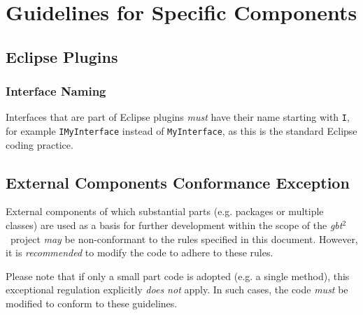 \documentclass[a4paper,12pt,liststotoc,DIV12]{scrartcl}
\newcommand{\gbt}{\textit{gbt$^2$}}
\begin{document}
\section{Guidelines for Specific Components}
\label{sec:specific-components}

\subsection{Eclipse Plugins}
\label{sec:specific:eclipse-plugins}

\subsubsection{Interface Naming}
\label{sec:eclipse:interface-naming}

Interfaces that are part of Eclipse plugins \emph{must} have their name
starting with \texttt{I}, for example \texttt{IMyInterface} instead of
\texttt{MyInterface}, as this is the standard Eclipse coding practice.

\subsection{External Components Conformance Exception}
\label{sec:specific:external-components}

External components of which substantial parts (e.g. packages or multiple
classes) are used as a basis for further development within the scope of the
\gbt\ project \emph{may} be non-conformant to the rules specified in this
document. However, it is \emph{recommended} to modify the code to adhere to
these rules.

Please note that if only a small part code is adopted (e.g. a single method),
this exceptional regulation explicitly \emph{does not} apply. In such cases,
the code \emph{must} be modified to conform to these guidelines.


\end{document}
